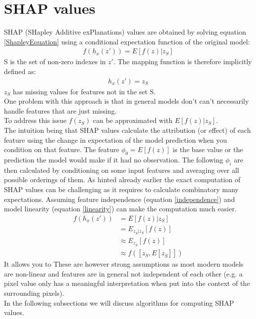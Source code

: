 \documentclass[conference]{IEEEtran}
\begin{document}
\section{SHAP values}
SHAP (SHapley Additive exPlanations) values \cite{b2} are obtained by solving equation \ref{ShapleyEquation} using a conditional expectation function of the original model:
\begin{align}
f(h_x(z')) = E[f(z) | z_S]
\end{align}
S is the set of non-zero indexes in $z'$. 
The mapping function is therefore implicitly defined as:\\
\begin{align}
h_x(z') = z_S
\end{align}
$z_S$ has missing values for features not in the set S.\\
One problem with this approach is that in general models don't can't necessarily handle features that are just missing.\\
To address this issue $f(z_S)$ can be approximated with $E[f(z)| z_S].$\\
The intuition being that SHAP values  calculate the attribution (or effect) of each feature using the change in expectation of the model prediction when you condition on that feature. 
The feature $\phi_0 = E[f(z)]$ is the base value or the prediction the model would make if it had no observation. 
The following $\phi_i$ are then calculated by conditioning on some input features and averaging over all possible orderings of them.
As hinted already earlier the exact computation of SHAP values can be challenging as it requires to calculate combinatory many expectations. 
Assuming feature independence (equation \ref{independence}) and model linearity (equation \ref{linearity}) can make the computation much easier. 
\begin{align}
f(h_x(z')) &= E[f(z)|z_{S}]\\
&= E_{z_{\overline{S}}|z_S}[f(z)]\\
&\approx E_{z_{\overline{S}}}[f(z)] \label{independence}\\ 
&\approx f([z_S, E[z_{\overline{S}}]])  \label{linearity}
\end{align}
It allows you to 
These are however strong assumptions as most modern models are non-linear and features are in general not independent of each other (e.g. a pixel value only has a meaningful interpretation when put into the context of the surrounding pixels).\\
In the following subsections we will discuss algorithms for computing SHAP values.
\end{document}
